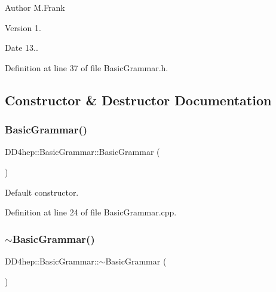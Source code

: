 \begin{DoxyAuthor}{Author}
M.\+Frank 
\end{DoxyAuthor}
\begin{DoxyVersion}{Version}
1. 
\end{DoxyVersion}
\begin{DoxyDate}{Date}
13.. 
\end{DoxyDate}


Definition at line 37 of file Basic\+Grammar.\+h.



\subsection{Constructor \& Destructor Documentation}
\hypertarget{class_d_d4hep_1_1_basic_grammar_adda1bb3c1b1167a1f81688092a40f02a}{}\label{class_d_d4hep_1_1_basic_grammar_adda1bb3c1b1167a1f81688092a40f02a} 
\subsubsection{\texorpdfstring{Basic\+Grammar()}{BasicGrammar()}}
{\footnotesize\ttfamily D\+D4hep\+::\+Basic\+Grammar\+::\+Basic\+Grammar (\begin{DoxyParamCaption}{ }\end{DoxyParamCaption})}



Default constructor. 



Definition at line 24 of file Basic\+Grammar.\+cpp.

\hypertarget{class_d_d4hep_1_1_basic_grammar_a9110ad3238c79f23fb42cdf69d3322b9}{}\label{class_d_d4hep_1_1_basic_grammar_a9110ad3238c79f23fb42cdf69d3322b9} 
\subsubsection{\texorpdfstring{$\sim$\+Basic\+Grammar()}{~BasicGrammar()}}
{\footnotesize\ttfamily D\+D4hep\+::\+Basic\+Grammar\+::$\sim$\+Basic\+Grammar (\begin{DoxyParamCaption}{ }\end{DoxyParamCaption})\hspace{0.3cm}{\ttfamily [virtual]}}



